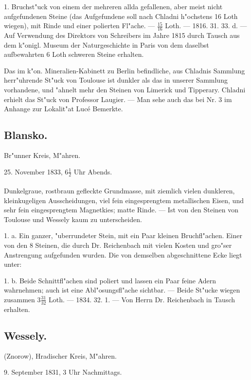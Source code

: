 \documentclass[a4paper, 11pt, oneside, polutonikogreek, german]{article}
\begin{document}
1. Bruchst"uck von einem der mehreren allda gefallenen, aber meist nicht aufgefundenen Steine (das Aufgefundene soll nach Chladni h"ochstens 16 Loth wiegen), mit Rinde und einer polierten Fl"ache. --- $\frac{15}{16}$ Loth. --- 1816. 31. 33. d. --- Auf Verwendung des Direktors von Schreibers im Jahre 1815 durch Tausch aus dem k"onigl. Museum der Naturgeschichte in Paris von dem daselbst aufbewahrten 6 Loth schweren Steine erhalten.

\setlength{\leftskip}{10mm}
\setlength{\parindent}{0pt}

{\footnotesize Das im k"on. Mineralien-Kabinett zu Berlin befindliche, aus Chladnis Sammlung herr"uhrende St"uck von Toulouse ist dunkler als das in unserer Sammlung vorhandene, und "ahnelt mehr den Steinen von Limerick und Tipperary. Chladni erhielt das St"uck von Professor Laugier. --- Man sehe auch das bei Nr. 3 im Anhange zur Lokalit"at Lucé Bemerkte.}

\setlength{\leftskip}{0pt}
\setlength{\parindent}{20pt}

\subsection{Blansko.}
\begin{center}
\small
Br"unner Kreis, M"ahren.

25. November 1833, $6\frac{1}{2}$ Uhr Abends.
\end{center}
\paragraph{}
Dunkelgraue, rostbraun gefleckte Grundmasse, mit ziemlich vielen dunkleren, kleinkugeligen Ausscheidungen, viel fein eingesprengtem metallischen Eisen, und sehr fein eingesprengtem Magnetkies; matte Rinde. --- Ist von den Steinen von Toulouse und Wessely kaum zu unterscheiden.

1. a. Ein ganzer, "uberrundeter Stein, mit ein Paar kleinen Bruchfl"achen. Einer von den 8 Steinen, die durch Dr. Reichenbach mit vielen Kosten und gro"ser Anstrengung aufgefunden wurden. Die von demselben abgeschnittene Ecke liegt unter:

1. b. Beide Schnittfl"achen sind poliert und lassen ein Paar feine Adern wahrnehmen; auch ist eine Abl"osungsfl"ache sichtbar. --- Beide St"ucke wiegen zusammen $3\frac{31}{32}$ Loth. --- 1834. 32. 1. --- Von Herrn Dr. Reichenbach in Tausch erhalten.
\subsection{Wessely.}
\begin{center}
\small
(Znorow), Hradischer Kreis, M"ahren.

9. September 1831, 3 Uhr Nachmittags.
\end{center}
\end{document}
